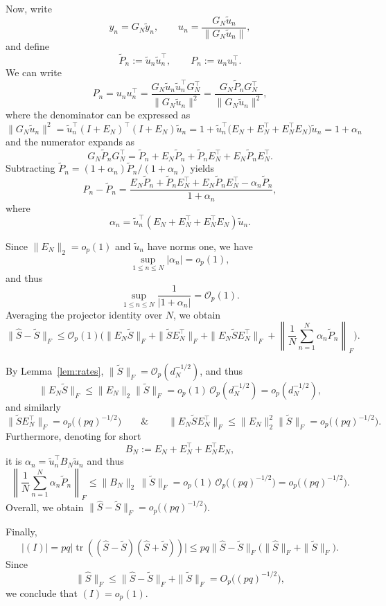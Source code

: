 \documentclass[12pt]{article}
\newcommand{\tr}{\operatorname{tr}}
\begin{document}
Now, write
\[
y_n=G_N\widetilde y_n,
\qquad
u_n=\frac{G_N\widetilde u_n}{\|G_N\widetilde u_n\|},
\]
and define
\[
\widetilde P_n:=\widetilde u_n\widetilde u_n^\top,
\qquad
P_n:=u_n u_n^\top.
\]
We can write
\[
P_n = u_nu_n^\top
= \frac{G_N\widetilde u_n\widetilde u_n^\top G_N^\top}{\|G_N\widetilde u_n\|^2}
= \frac{G_N\widetilde P_nG_N^\top}{\|G_N\widetilde u_n\|^2},
\]
where the denominator can be expressed as
\[
\|G_N\widetilde u_n\|^2
= \widetilde u_n^\top(I+E_N)^\top(I+E_N)\widetilde u_n
= 1+\widetilde u_n^\top\!\bigl(E_N+E_N^\top+E_N^\top E_N\bigr)\widetilde u_n
= 1+\alpha_n
\]
and the numerator expands as
\[
G_N\widetilde P_nG_N^\top
= \widetilde P_n + E_N\widetilde P_n + \widetilde P_nE_N^\top + E_N\widetilde P_nE_N^\top.
\]
Subtracting $\widetilde P_n = (1+\alpha_n)\widetilde P_n/(1+\alpha_n)$ yields
\[
P_n-\widetilde P_n
=
\frac{
	E_N\widetilde P_n+\widetilde P_nE_N^\top+E_N\widetilde P_nE_N^\top
	-\alpha_{n}\widetilde P_n
}{1+\alpha_{n}},
\]
where
\[
\alpha_{n}
=
\widetilde u_n^\top(E_N+E_N^\top+E_N^\top E_N)\widetilde u_n.
\]


Since \(\|E_N\|_{2}=o_p(1)\) and $\widetilde u_n$ have norms one, we have
\[
\sup_{1\le n\le N}|\alpha_{n}|=o_p(1),
\]
and thus
\[
\sup_{1\le n\le N}\frac1{|1+\alpha_{n}|}=\mathcal O_p(1).
\]
Averaging the projector identity over $N$, we obtain
\[
\|\widehat S-\widetilde S\|_F
\le
\mathcal O_p(1) \Bigg(
\|E_N\widetilde S\|_F
+
\|\widetilde S E_N^\top\|_F
+
\|E_N\widetilde S E_N^\top\|_F
+
\left\|
\frac1N\sum_{n=1}^N \alpha_{n}\widetilde P_n
\right\|_F
\Bigg).
\]

By Lemma~\ref{lem:rates}, $\|\widetilde S\|_F=\mathcal O_p(d_N^{-1/2})$, and thus
\[
\|E_N\widetilde S \|_F
\le
\|E_N\|_{2}\|\widetilde S \|_F
=
o_p(1)\,\mathcal O_p(d_N^{-1/2})
=
o_p(d_N^{-1/2}),
\]
and similarly
\[
\|\widetilde S E_N^\top\|_F=o_p\big((pq)^{-1/2}\big)
\qquad \& \qquad
\|E_N\widetilde S E_N^\top\|_F
\le
\|E_N\|_{2}^2\|\widetilde S \|_F
=
o_p\big((pq)^{-1/2}\big).
\]
Furthermore, denoting for short
\[
B_N:=E_N+E_N^\top+E_N^\top E_N,
\]
it is $\alpha_{n}=\widetilde u_n^\top B_N\widetilde u_n$ and thus
\[
\left\|
\frac1N\sum_{n=1}^N \alpha_{n}\widetilde P_n
\right\|_F
\le
\|B_N\|_{2}\,\|\widetilde S\|_F
=
o_p(1)\,\mathcal O_p\big((pq)^{-1/2}\big)
=
o_p\big((pq)^{-1/2}\big).
\]
Overall, we obtain $\|\widehat S-\widetilde S\|_F=o_p\big((pq)^{-1/2}\big)$.

Finally,
\[
|(I)|
=
pq\bigl|\tr((\widehat S -\widetilde S )(\widehat S +\widetilde S ))\bigr|
\le
pq\|\widehat S -\widetilde S \|_F
\bigl(\|\widehat S \|_F+\|\widetilde S \|_F\bigr).
\]
Since
\[
\|\widehat S \|_F
\le
\|\widehat S -\widetilde S \|_F+\|\widetilde S \|_F
=
O_p\big((pq)^{-1/2}\big),
\]
we conclude that $(I)=o_p(1)$.
\end{document}
